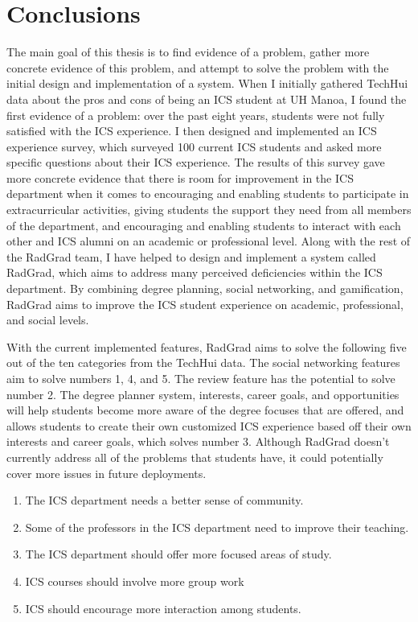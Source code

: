 \chapter{Conclusions}
The main goal of this thesis is to find evidence of a problem, gather more concrete evidence of this problem, and attempt to solve the problem with the initial design and implementation of a system. When I initially gathered TechHui data about the pros and cons of being an ICS student at UH Manoa, I found the first evidence of a problem: over the past eight years, students were not fully satisfied with the ICS experience. I then designed and implemented an ICS experience survey, which surveyed 100 current ICS students and asked more specific questions about their ICS experience. The results of this survey gave more concrete evidence that there is room for improvement in the ICS department when it comes to encouraging and enabling students to participate in extracurricular activities, giving students the support they need from all members of the department, and encouraging and enabling students to interact with each other and ICS alumni on an academic or professional level. Along with the rest of the RadGrad team, I have helped to design and implement a system called RadGrad, which aims to address many perceived deficiencies within the ICS department. By combining degree planning, social networking, and gamification, RadGrad aims to improve the ICS student experience on academic, professional, and social levels. 

With the current implemented features, RadGrad aims to solve the following five out of the ten categories from the TechHui data. The social networking features aim to solve numbers 1, 4, and 5. The review feature has the potential to solve number 2. The degree planner system, interests, career goals, and opportunities will help students become more aware of the degree focuses that are offered, and allows students to create their own customized ICS experience based off their own interests and career goals, which solves number 3. Although RadGrad doesn't currently address all of the problems that students have, it could potentially cover more issues in future deployments. 

\begin{enumerate}
  \item The ICS department needs a better sense of community.
  \item Some of the professors in the ICS department need to improve their teaching.
  \item The ICS department should offer more focused areas of study.
  \item ICS courses should involve more group work 
  \item ICS should encourage more interaction among students.
\end{enumerate}

